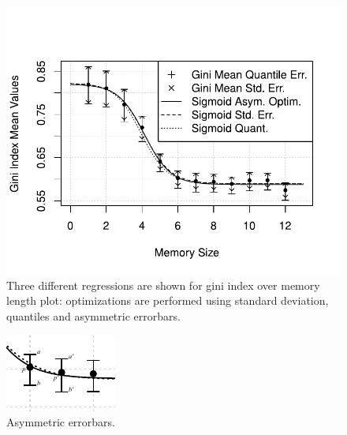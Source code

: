 \begin{figure}[h!]
  \centering
  \includegraphics[width=.8\columnwidth]{img/appendix.pdf}
  \caption[Three different regressions for Gini index.]{Three different regressions are shown for gini index over
    memory length plot: optimizations are performed using standard
    deviation, quantiles and asymmetric errorbars.}
  \label{fig:gausssigma}
\end{figure}
\begin{figure}[h!]
  \centering
  \includegraphics[width=.5\columnwidth]{img/err.pdf}
  \caption{Asymmetric errorbars.}
  \label{fig:errors}
\end{figure}
\\
